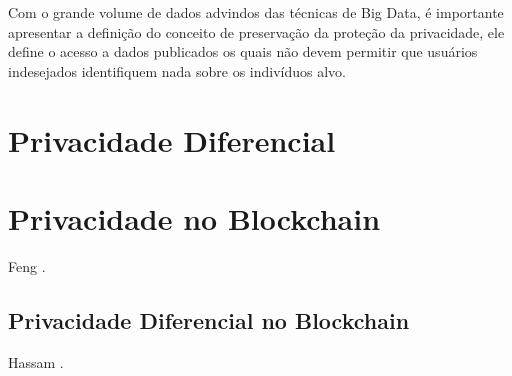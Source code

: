 Com o grande volume de dados advindos das técnicas de Big Data, é importante apresentar a definição do conceito de preservação da proteção da privacidade, ele define o acesso a dados publicados os quais não devem permitir que usuários indesejados identifiquem nada sobre os indivíduos alvo.

\chapter{Privacidade Diferencial}
\label{cap:privacidadediferencial}

\chapter{Privacidade no Blockchain}
\label{cap:blockchain}
Feng \cite{Feng2019}.

\section{Privacidade Diferencial no Blockchain}
Hassam \cite{Hassan2020}. %


